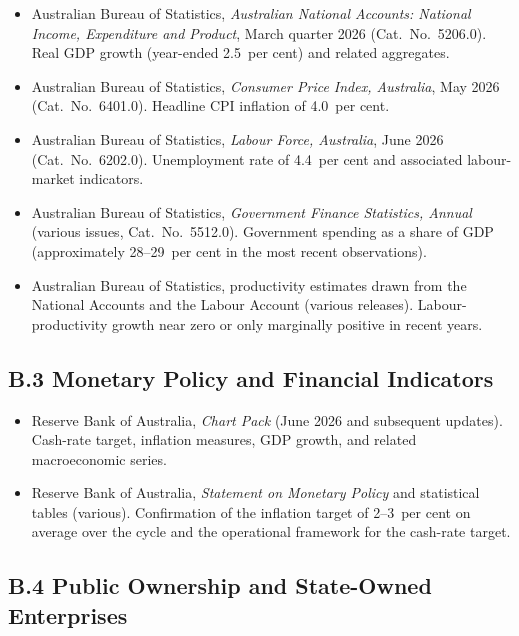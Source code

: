 \documentclass[12pt,anyside]{book}
\theoremstyle{definition}
\theoremstyle{plain}
\theoremstyle{remark}
\begin{document}
\begin{itemize}
\item Australian Bureau of Statistics, \textit{Australian National Accounts: National Income, Expenditure and Product}, March quarter 2026 (Cat.\ No.\ 5206.0).  
  Real GDP growth (year-ended 2.5~per cent) and related aggregates.

\item Australian Bureau of Statistics, \textit{Consumer Price Index, Australia}, May 2026 (Cat.\ No.\ 6401.0).  
  Headline CPI inflation of 4.0~per cent.

\item Australian Bureau of Statistics, \textit{Labour Force, Australia}, June 2026 (Cat.\ No.\ 6202.0).  
  Unemployment rate of 4.4~per cent and associated labour-market indicators.

\item Australian Bureau of Statistics, \textit{Government Finance Statistics, Annual} (various issues, Cat.\ No.\ 5512.0).  
  Government spending as a share of GDP (approximately 28--29~per cent in the most recent observations).

\item Australian Bureau of Statistics, productivity estimates drawn from the National Accounts and the Labour Account (various releases).  
  Labour-productivity growth near zero or only marginally positive in recent years.
\end{itemize}

\subsection*{B.3 Monetary Policy and Financial Indicators}

\begin{itemize}
\item Reserve Bank of Australia, \textit{Chart Pack} (June 2026 and subsequent updates).  
  Cash-rate target, inflation measures, GDP growth, and related macroeconomic series.

\item Reserve Bank of Australia, \textit{Statement on Monetary Policy} and statistical tables (various).  
  Confirmation of the inflation target of 2--3~per cent on average over the cycle and the operational framework for the cash-rate target.
\end{itemize}

\subsection*{B.4 Public Ownership and State-Owned Enterprises}
\end{document}
